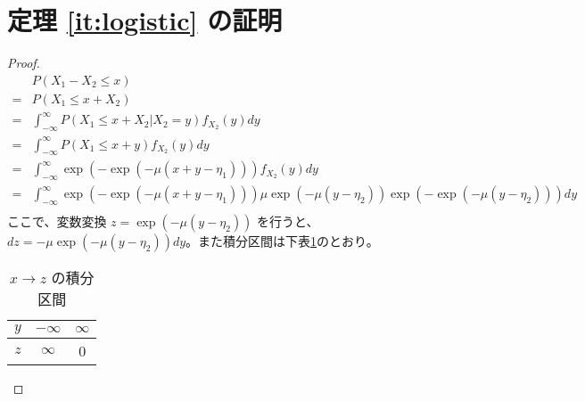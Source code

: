 \section{定理 \ref{it:logistic} の証明}
\begin{proof}
    \label{prf:logistic}
    \begin{equation}
        \begin{aligned}
              & P(X_1-X_2 \le x)                                                                                              \\
            = & P(X_1 \le x+X_2)                                                                                              \\
            = & \int_{-\infty}^{\infty} P(X_1 \le x+X_2|X_2=y)f_{X_2}(y)dy                                                    \\
            = & \int_{-\infty}^{\infty} P(X_1 \le x+y)f_{X_2}(y)dy                                                            \\
            = & \int_{-\infty}^{\infty} \exp(-\exp(-\mu(x+y-\eta_1)))f_{X_2}(y)dy                                             \\
            = & \int_{-\infty}^{\infty} \exp(-\exp(-\mu(x+y-\eta_1)))\mu \exp(-\mu (y-\eta_2)) \exp(-\exp(-\mu (y-\eta_2)))dy \\
        \end{aligned}
    \end{equation}
    ここで、変数変換 $z = \exp(-\mu (y-\eta_2))$ を行うと、$dz = -\mu\exp(-\mu (y-\eta_2))dy$。また積分区間は下表\ref{tbl:int_interval}のとおり。

    \begin{table}[ht]
        \caption{$x \to z$ の積分区間}
        \centering
        \label{tbl:int_interval}
        \begin{tabular}{ccc}
            \hline
            $y$ & $-\infty$ & $\infty$ \\
            \hline
            $z$ & $\infty$  & 0        \\
            \hline
        \end{tabular}
    \end{table}


\end{proof}
